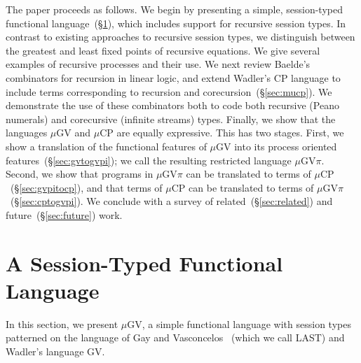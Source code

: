 \documentclass[orivec,envcountsame]{llncs}
\newcommand{\mucp}{$\mu\mathrm{CP}$\xspace}
\newcommand{\mugv}{$\mu\mathrm{GV}$\xspace}
\newcommand{\gvpi}{$\mu\mathrm{GV}\pi$\xspace}
\newcommand{\secref}[1]{(\S\ref{sec:#1})}
\newcommand{\todo}[1]{{\noindent\small\color{red} \framebox{\parbox{\dimexpr\linewidth-2\fboxsep-2\fboxrule}{\textbf{TODO:} #1}}}}
\begin{document}
The paper proceeds as follows. We begin by presenting a simple, session-typed functional
language~\secref{mugv}, which includes support for recursive session types.  In contrast to existing
approaches to recursive session types, we distinguish between the greatest and least fixed points of
recursive equations.  We give several examples of recursive processes and their use.  We next review
Baelde's combinators for recursion in linear logic, and extend Wadler's CP language to include terms
corresponding to recursion and corecursion~\secref{mucp}.  We demonstrate the use of these
combinators both to code both recursive (Peano numerals) and corecursive (infinite streams)
types. Finally, we show that the languages \mugv and \mucp are equally expressive.  This has two
stages.  First, we show a translation of the functional features of \mugv into its process oriented
features~\secref{gvtogvpi}; we call the resulting restricted language \gvpi.  Second, we show that
programs in \gvpi can be translated to terms of \mucp~\secref{gvpitocp}, and that terms of \mucp can
be translated to terms of \gvpi~\secref{cptogvpi}.  We conclude with a survey of
related~\secref{related} and future~\secref{future} work.


\section{A Session-Typed Functional Language}
\label{sec:mugv}

In this section, we present \mugv, a simple functional language with session types patterned on the
language of Gay and Vasconcelos~\cite{GayVasconcelos10} (which we call LAST) and Wadler's language
GV.
\end{document}

